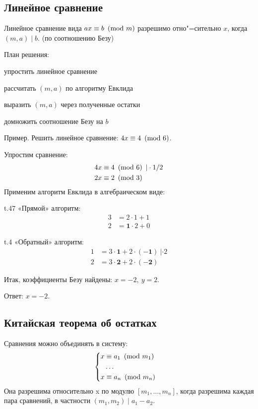 \subsection{Линейное сравнение}

{\ital Линейное} сравнение вида $ax\equiv b\ \left(\mathrm{mod}\ m\right)$ разрешимо отно"=сительно $x$, когда $(m,a)\mid b$. {\ital\color[HTML]{888888} (по соотношению Безу)}

План решения:
\begin{list*}
\item упростить линейное сравнение
\item рассчитать $(m,a)$ по алгоритму Евклида
\item выразить $(m,a)$ через полученные остатки
\item домножить соотношение Безу на $b$
\end{list*}
{\bold Пример.} Решить линейное сравнение: $4x\equiv 4\ \left(\mathrm{mod}\ 6\right)$.\par
Упростим сравнение:
\begin{align*}
4x&\equiv 4\ \left(\mathrm{mod}\ 6\right)\ |\cdot 1/2\\
2x&\equiv 2\ \left(\mathrm{mod}\ 3\right)
\end{align*}
Применим {\ital алгоритм Евклида} в алгебраическом виде:\par
\begin{column*}{t}{.47\linewidth}
{\ital «Прямой» алгоритм:}
\begin{align*}
3&=2\cdot 1+1\\
2&=\symbf{1}\cdot 2+0
\end{align*}
\end{column*}
\begin{column*}{t}{.4\linewidth}
{\ital «Обратный» алгоритм:}
\begin{align*}
1&=3\cdot \symbf{1}+2\cdot (\symbf{-1})\ |\cdot 2\\
2&=3\cdot \symbf{2}+2\cdot (\symbf{-2})
\end{align*}
\end{column*}\par
Итак, коэффициенты Безу найдены: $x=-2,\ y=2$.\par
{\ital Ответ:} $x=-2$.\par

\subsection{Китайская теорема об остатках}

Сравнения можно объединять в {\ital систему}:
$$\begin{cases}
\begin{aligned}
x&\equiv a_1\ \left(\mathrm{mod}\ m_1\right)\\
&\dots\\
x&\equiv a_n\ \left(\mathrm{mod}\ m_n\right)
\end{aligned}
\end{cases}$$
Она разрешима относительно {\ital x} по модулю $[m_1,\ldots,m_n]$, когда разрешима каждая пара сравнений, в частности $(m_1,m_2)\mid a_1-a_2$.

